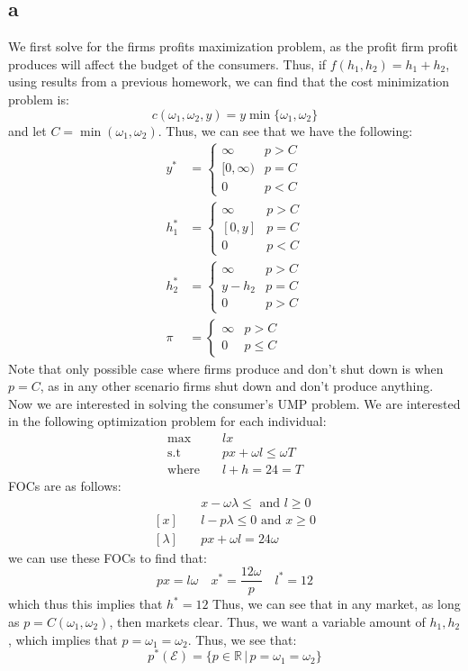 \documentclass[11pt]{article}
\newcommand{\R}{\mathbb{R}}
\newcommand{\st}{\text{s.t}}
\begin{document}
\subsection*{a}
We first solve for the firms profits maximization problem, as the profit firm profit produces will affect the budget of the consumers. Thus, if $f(h_1, h_2) = h_1 + h_2$, using results from a previous homework, we can find that the cost minimization problem is:
\[
c(\omega_1, \omega_2, y) = y\min\{\omega_1, \omega_2\}
\]
and let $C = \min(\omega_1, \omega_2)$. Thus, we can see that we have the following:
\begin{align*}
    y^* &= \begin{cases}
        \infty & p > C\\
        [0,\infty) & p = C\\
        0 & p < C
    \end{cases}\\
    h_1^* &= \begin{cases}
        \infty & p>C\\
        [0, y] & p = C\\
        0 & p < C
    \end{cases}\\
    h_2^* &= \begin{cases}
        \infty & p > C\\
        y - h_2 & p = C\\
        0 & p > C
    \end{cases}\\
    \pi &= \begin{cases}
        \infty & p > C\\
        0 & p \leq C
    \end{cases}
\end{align*}
Note that only possible case where firms produce and don't shut down is when $p = C$, as in any other scenario firms shut down and don't produce anything. Now we are interested in solving the consumer's UMP problem. We are interested in the following optimization problem for each individual:
\begin{align*}
    \max & \quad l x\\
    \st & \quad px + \omega l \leq \omega T \\
    \text{where} & \quad l + h = 24 = T
\end{align*}
FOCs are as follows:
\begin{align*}
    [l] & \quad x - \omega \lambda \leq \text{ and } l \geq 0\\
    [x] & \quad l - p \lambda \leq 0 \text{ and } x \geq 0\\
    [\lambda] & \quad px + \omega l = 24 \omega 
\end{align*}
we can use these FOCs to find that:
\[
px = l\omega  \quad x^* = \frac{12\omega}{p} \quad l^* = 12
\]
which thus this implies that $h^* = 12$ Thus, we can see that in any market, as long as $p = C(\omega_1, \omega_2)$, then markets clear. Thus, we want a variable amount of $h_1, h_2$, which implies that $p = \omega_1 = \omega_2$. Thus, we see that:
\[
p^*(\mathcal{E}) = \{p \in \R \hspace{2pt} | \hspace{2pt} p = \omega_1 = \omega_2\}
\]
\end{document}
